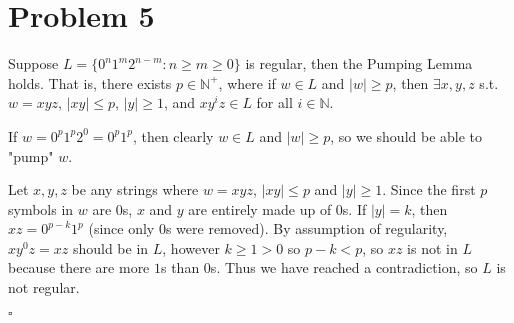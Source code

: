 \documentclass[12pt]{article}
\newcommand{\N}{\mathbb{N}}
\begin{document}


\newpage
\section*{Problem 5}

Suppose $L = \{0^n 1^m 2^{n-m} : n \geq m \geq 0 \}$ is regular, then the Pumping Lemma holds. That is, there exists $p \in \N^+$, where if $w \in L$ and $|w| \geq p$, then $\exists x, y, z$ s.t. $w = xyz$, $|xy| \leq p$, $|y| \geq 1$, and $xy^iz \in L$ for all $i \in \N$.

If $w = 0^p 1^p 2^0 = 0^p 1^p$, then clearly $w \in L$ and $|w| \geq p$, so we should be able to "pump" $w$.

Let $x, y, z$ be any strings where $w = xyz$, $|xy| \leq p$ and $|y| \geq 1$. Since the first $p$ symbols in $w$ are $0$s, $x$ and $y$ are entirely made up of $0$s. If $|y| = k$, then $xz = 0^{p-k} 1^p$ (since only $0$s were removed). By assumption of regularity, $xy^0z = xz$ should be in $L$, however $k \geq 1 > 0$ so $p - k < p$, so $xz$ is not in $L$ because there are more $1$s than $0$s. Thus we have reached a contradiction, so $L$ is not regular.

\hfill $\square$
\end{document}
